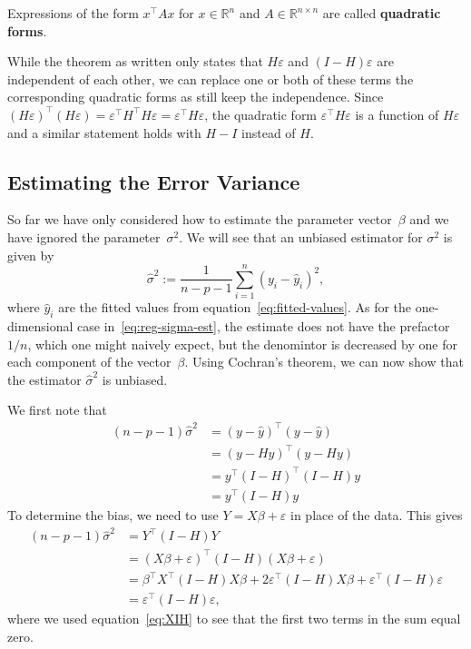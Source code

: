 \documentclass[
  a4paper,
]{article}
\theoremstyle{definition}
\theoremstyle{definition}
\theoremstyle{definition}
\theoremstyle{definition}
\theoremstyle{remark}
\begin{document}
Expressions of the form \(x^\top A x\) for \(x\in\mathbb{R}^n\) and \(A\in\mathbb{R}^{n\times n}\)
are called \textbf{quadratic forms}.

While the theorem as written only states that \(H \varepsilon\) and \((I - H)\varepsilon\)
are independent of each other, we can replace one or both of these terms
the corresponding quadratic forms as still keep the independence. Since
\((H \varepsilon)^\top (H \varepsilon) = \varepsilon^\top H^\top H \varepsilon= \varepsilon^\top H \varepsilon\),
the quadratic form \(\varepsilon^\top H \varepsilon\) is a function of \(H \varepsilon\) and a similar
statement holds with \(H-I\) instead of \(H\).

\hypertarget{var-est-bias}{%
\subsection{Estimating the Error Variance}\label{var-est-bias}}

So far we have only considered how to estimate the parameter
vector~\(\beta\) and we have ignored the parameter~\(\sigma^2\).
We will see that an unbiased estimator for \(\sigma^2\) is
given by
\begin{equation}
  \hat\sigma^2
  := \frac{1}{n-p-1} \sum_{i=1}^n (y_i - \hat y_i)^2, \label{eq:hat-sigma-squared}
\end{equation}
where \(\hat y_i\) are the fitted values from equation~\eqref{eq:fitted-values}.
As for the one-dimensional case in~\eqref{eq:reg-sigma-est}, the estimate
does not have the prefactor \(1/n\), which one might naively expect,
but the denomintor is decreased by one for each component of the
vector~\(\beta\). Using Cochran's theorem, we can now show that the estimator
\(\hat\sigma^2\) is unbiased.

We first note that
\begin{align*}
  (n - p - 1) \hat\sigma^2
  &= (y - \hat y)^\top (y - \hat y) \\
  &= (y - H y)^\top (y - H y) \\
  &= y^\top (I - H)^\top (I - H) y \\
  &= y^\top (I - H) y
\end{align*}
To determine the bias, we need to use \(Y = X\beta + \varepsilon\) in place of the
data. This gives
\begin{align*}
  (n - p - 1) \hat\sigma^2
  &= Y^\top (I-H) Y \\
  &= (X\beta + \varepsilon)^\top (I-H) (X\beta + \varepsilon) \\
  &= \beta^\top X^\top (I-H) X \beta
      + 2 \varepsilon^\top (I-H) X \beta
      + \varepsilon^\top (I-H) \varepsilon\\
  &= \varepsilon^\top (I-H) \varepsilon,
\end{align*}
where we used equation~\eqref{eq:XIH} to see that the first two terms in
the sum equal zero.
\end{document}
